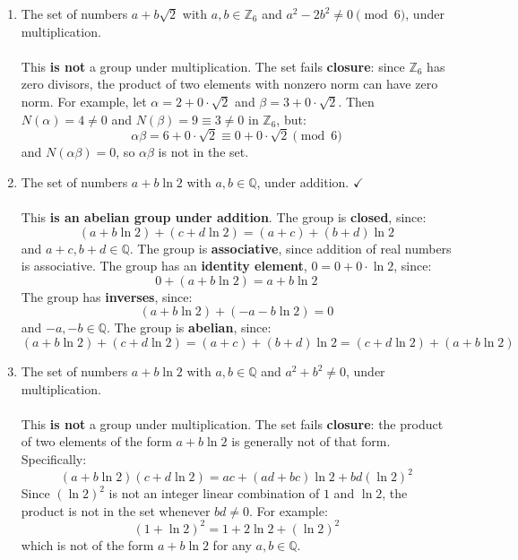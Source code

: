 \documentclass{article}
\newcommand{\Q}{\mathbb{Q}}
\newcommand{\Zn}[1]{\mathbb{Z}_{#1}}
\begin{document}
\begin{enumerate}
\begin{enumerate}
            \item The set of numbers $a + b\sqrt{2}$ with $a,b \in \Zn{6}$ and $a^2 - 2b^2 \neq 0 \pmod{6}$, under multiplication.
            \\
            \\ This \textbf{is not} a group under multiplication. The set fails \textbf{closure}: since $\Zn{6}$ has zero divisors, the product of two elements with nonzero norm can have zero norm. For example, let $\alpha = 2+0\cdot\sqrt{2}$ and $\beta = 3+0\cdot\sqrt{2}$. Then $N(\alpha)=4\neq 0$ and $N(\beta)=9\equiv 3\neq 0$ in $\Zn{6}$, but:
            \[
                \alpha\beta = 6+0\cdot\sqrt{2} \equiv 0+0\cdot\sqrt{2} \pmod{6}
            \]
            and $N(\alpha\beta)=0$, so $\alpha\beta$ is not in the set.

            \item The set of numbers $a + b\ln 2$ with $a,b \in \Q$, under addition. $\checkmark$
            \\
            \\ This \textbf{is an abelian group under addition}. The group is \textbf{closed}, since:
            \[
                (a + b\ln 2) + (c + d\ln 2) = (a+c) + (b+d)\ln 2
            \]
            and $a+c, b+d \in \Q$. The group is \textbf{associative}, since addition of real numbers is associative. The group has an \textbf{identity element}, $0 = 0+0\cdot\ln 2$, since:
            \[
                0 + (a+b\ln 2) = a+b\ln 2
            \]
            The group has \textbf{inverses}, since:
            \[
                (a+b\ln 2) + (-a - b\ln 2) = 0
            \]
            and $-a,-b \in \Q$. The group is \textbf{abelian}, since:
            \[
                (a+b\ln 2)+(c+d\ln 2) = (a+c)+(b+d)\ln 2 = (c+d\ln 2)+(a+b\ln 2)
            \]

            \item The set of numbers $a + b\ln 2$ with $a,b \in \Q$ and $a^2+b^2 \neq 0$, under multiplication.
            \\
            \\ This \textbf{is not} a group under multiplication. The set fails \textbf{closure}: the product of two elements of the form $a+b\ln 2$ is generally not of that form. Specifically:
            \[
                (a + b\ln 2)(c + d\ln 2) = ac + (ad+bc)\ln 2 + bd(\ln 2)^2
            \]
            Since $(\ln 2)^2$ is not an integer linear combination of $1$ and $\ln 2$, the product is not in the set whenever $bd \neq 0$. For example:
            \[
                (1 + \ln 2)^2 = 1 + 2\ln 2 + (\ln 2)^2
            \]
            which is not of the form $a + b\ln 2$ for any $a,b \in \Q$.


\end{enumerate}
\end{enumerate}
\end{document}
